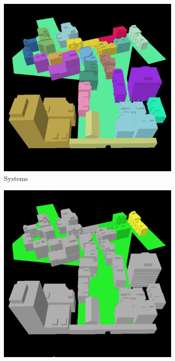 \begin{figure}\label{f:systems}
	\begin{subfigure}[b]{0.285\textwidth}
		\includegraphics[width=1.0\textwidth]{graphics/gi/path-30-1}
		\caption{Systems}
	\end{subfigure}
	\begin{subfigure}[b]{0.285\textwidth}
		\includegraphics[width=1.0\textwidth]{graphics/gi/path-30-2}

\end{subfigure}
\end{figure}
